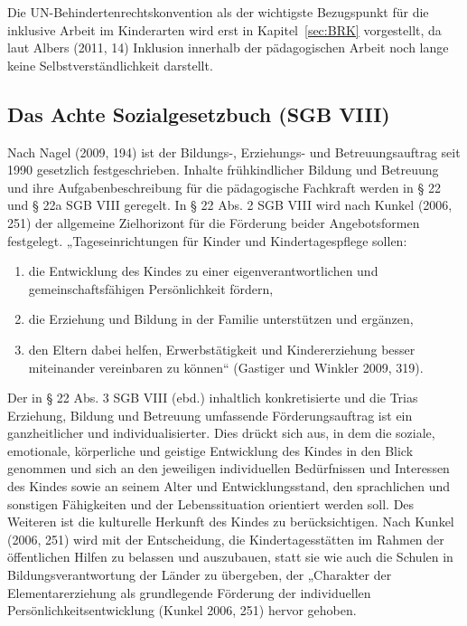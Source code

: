 Die UN-Behindertenrechtskonvention als der wichtigste Bezugspunkt für die inklusive Arbeit im Kinderarten wird erst in Kapitel~\ref{sec:BRK} vorgestellt, da laut Albers (2011, 14) Inklusion innerhalb der pädagogischen Arbeit noch lange keine Selbstverständlichkeit darstellt.  

\subsection{Das Achte Sozialgesetzbuch (SGB VIII)}\label{kap:AchtesSGB}

Nach Nagel (2009, 194) ist der Bildungs-, Erziehungs- und Betreuungsauftrag seit 1990 gesetzlich festgeschrieben. Inhalte frühkindlicher Bildung und Betreuung und ihre Aufgabenbeschreibung für die pädagogische Fachkraft werden in § 22 und § 22a SGB VIII geregelt. 
In § 22 Abs. 2 SGB VIII wird nach Kunkel (2006, 251) der allgemeine Zielhorizont für die Förderung beider Angebotsformen festgelegt. 
„Tageseinrichtungen für Kinder und Kindertagespflege sollen:

\begin{enumerate}
\item die Entwicklung des Kindes zu einer eigenverantwortlichen und gemeinschaftsfähigen Persönlichkeit fördern,
\item die Erziehung und Bildung in der Familie unterstützen und ergänzen,
\item den Eltern dabei helfen, Erwerbstätigkeit und Kindererziehung besser miteinander vereinbaren zu können“ (Gastiger und Winkler 2009, 319).  
\end{enumerate}

Der in § 22 Abs. 3 SGB VIII (ebd.) inhaltlich konkretisierte und die Trias Erziehung, Bildung und Betreuung umfassende Förderungsauftrag ist ein ganzheitlicher und individualisierter. Dies drückt sich aus, in dem die soziale, emotionale, körperliche und geistige Entwicklung des Kindes in den Blick genommen und sich an den jeweiligen individuellen Bedürfnissen und Interessen des Kindes sowie an seinem Alter und Entwicklungsstand, den sprachlichen und sonstigen Fähigkeiten und der Lebenssituation orientiert werden soll. Des Weiteren ist die kulturelle Herkunft des Kindes zu berücksichtigen. Nach Kunkel (2006, 251) wird mit der Entscheidung, die Kindertagesstätten im Rahmen der öffentlichen Hilfen zu belassen und auszubauen, statt sie wie auch die Schulen in Bildungsverantwortung der Länder zu übergeben, der „Charakter der Elementarerziehung als grundlegende Förderung der individuellen Persönlichkeitsentwicklung (Kunkel 2006, 251) hervor gehoben. 

